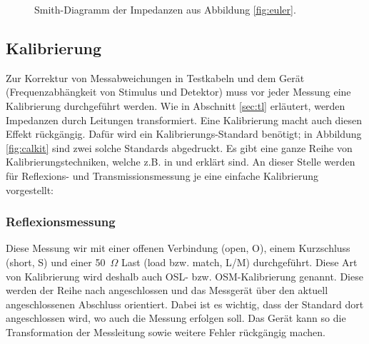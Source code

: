 \documentclass[twoside,a4paper,11pt,halfparskip,DIV=11,notitlepage]{scrartcl}
\newcommand{\Ohm}{$\Omega$\xspace}
\begin{document}
\begin{figure}
    \caption{Smith-Diagramm der Impedanzen aus Abbildung \ref{fig:euler}.}
    \label{fig:smithimpedance}
\end{figure}

\subsection{Kalibrierung}\label{sec:calibration}

Zur Korrektur von Messabweichungen in Testkabeln und dem Gerät
(Frequenzabhängkeit von Stimulus und Detektor) muss vor jeder Messung eine
Kalibrierung durchgeführt werden. Wie in Abschnitt \ref{sec:tl} erläutert,
werden Impedanzen durch Leitungen transformiert. Eine Kalibrierung macht
auch diesen Effekt rückgängig. Dafür wird ein Kalibrierungs-Standard
benötigt; in Abbildung \ref{fig:calkit} sind zwei solche Standards abgedruckt.
Es gibt eine ganze Reihe von Kalibrierungstechniken, welche z.B.
in \cite{hiebel2007fundamentals}  und \cite{hiebel2008vector} erklärt sind.
An dieser Stelle werden für Reflexions- und Transmissionsmessung je eine
einfache Kalibrierung vorgestellt:

\subsubsection{Reflexionsmessung}
Diese Messung wir mit einer offenen Verbindung (open, O), einem Kurzschluss
(short, S) und einer 50~\Ohm Last (load bzw. match, L/M) durchgeführt. Diese Art von
Kalibrierung wird deshalb auch OSL- bzw. OSM-Kalibrierung genannt. Diese
werden der Reihe nach angeschlossen und das Messgerät über den aktuell angeschlossenen
Abschluss orientiert. Dabei ist es wichtig, dass der Standard dort angeschlossen
wird, wo auch die Messung erfolgen soll. Das Gerät kann so die Transformation
der Messleitung sowie weitere Fehler rückgängig machen.
\end{document}
